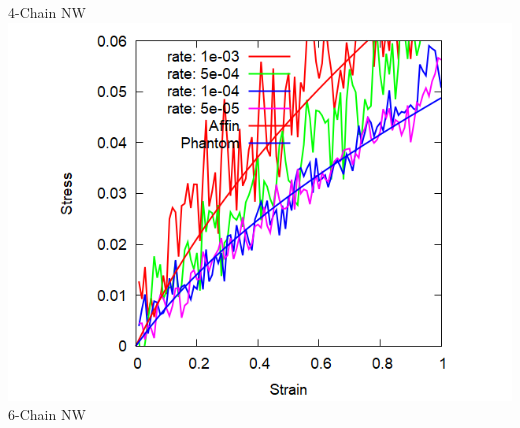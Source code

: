 \documentclass[12pt, dvipdfmx]{beamer}
\begin{document}
\begin{frame}
\begin{columns}[T, onlytextwidth]
			4-Chain NW
		\centering
		\includegraphics[width=\textwidth]{6chain_shear.png}
		6-Chain NW
	\end{columns}
\end{frame}
\end{document}
